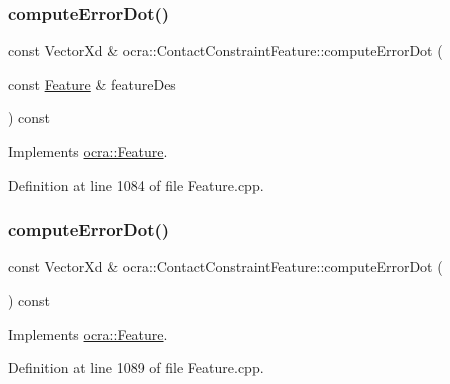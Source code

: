 \subsubsection{\texorpdfstring{compute\+Error\+Dot()}{computeErrorDot()}\hspace{0.1cm}{\footnotesize\ttfamily [1/2]}}
{\footnotesize\ttfamily const Vector\+Xd \& ocra\+::\+Contact\+Constraint\+Feature\+::compute\+Error\+Dot (\begin{DoxyParamCaption}\item[{const \hyperlink{classocra_1_1Feature}{Feature} \&}]{feature\+Des }\end{DoxyParamCaption}) const\hspace{0.3cm}{\ttfamily [virtual]}}



Implements \hyperlink{classocra_1_1Feature_ac714181e1bb25f878349e299c4ba8c00}{ocra\+::\+Feature}.



Definition at line 1084 of file Feature.\+cpp.

\hypertarget{classocra_1_1ContactConstraintFeature_afbe828f952c7583b690e394efd05423f}{}\label{classocra_1_1ContactConstraintFeature_afbe828f952c7583b690e394efd05423f} 
\subsubsection{\texorpdfstring{compute\+Error\+Dot()}{computeErrorDot()}\hspace{0.1cm}{\footnotesize\ttfamily [2/2]}}
{\footnotesize\ttfamily const Vector\+Xd \& ocra\+::\+Contact\+Constraint\+Feature\+::compute\+Error\+Dot (\begin{DoxyParamCaption}{ }\end{DoxyParamCaption}) const\hspace{0.3cm}{\ttfamily [virtual]}}



Implements \hyperlink{classocra_1_1Feature_a01a4870418ba87d5b41d8f917c1255fc}{ocra\+::\+Feature}.



Definition at line 1089 of file Feature.\+cpp.

\hypertarget{classocra_1_1ContactConstraintFeature_a7b0fc26f03104eb02a7ba565b99a41d7}{}\label{classocra_1_1ContactConstraintFeature_a7b0fc26f03104eb02a7ba565b99a41d7} 
